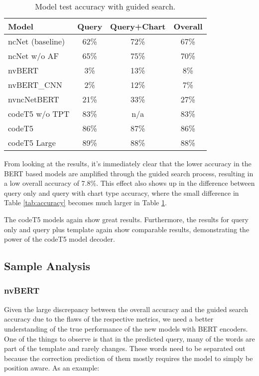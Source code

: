 \documentclass[
	a4paper, %
	10pt, %
	unnumberedsections, %
	twoside, %
]{t0003}
\begin{document}
\begin{table} %
	\caption{Model test accuracy with guided search.}
	\centering
	\begin{tabular}{lccc}
		\toprule
		Model & Query & Query+Chart & Overall \\
		\midrule
		ncNet (baseline) & 62\% &72\% & 67\% \\
		ncNet w/o AF & 65\% & 75\% & 70\% \\
		\hline
		nvBERT & 3\% & 13\% & 8\% \\
		nvBERT\_CNN & 2\% & 12\% & 7\% \\
		nvncNetBERT & 21\% & 33\% & 27\% \\
		\hline
		codeT5 w/o TPT & 83\% & n/a & 83\% \\
		codeT5 & 86\% & 87\% & 86\% \\
		codeT5 Large & 89\% & 88\% & 88\% \\
		\bottomrule
	\end{tabular}
	\label{tab:guidedaccuracy}
\end{table}

From looking at the results, it's immediately clear that the lower accuracy in the BERT based models are amplified through the guided search process, resulting in a low overall accuracy of 7.8\%. This effect also shows up in the difference between query only and query with chart type accuracy, where the small difference in Table \ref{tab:accuracy} becomes much larger in Table \ref{tab:guidedaccuracy}.

The codeT5 models again show great results. Furthermore, the results for query only and query plus template again show comparable results, demonstrating the power of the codeT5 model decoder.

\subsection{Sample Analysis}

\subsubsection{nvBERT} Given the large discrepancy between the overall accuracy and the guided search accuracy due to the flaws of the respective metrics, we need a better understanding of the true performance of the new models with BERT encoders. One of the things to observe is that in the predicted query, many of the words are part of the template and rarely changes. These words need to be separated out because the correction prediction of them mostly requires the model to simply be position aware. As an example:
\end{document}
